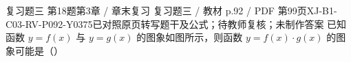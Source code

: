 \par\noindent\begin{minipage}{\linewidth}
\begin{bankitem}{复习题三 第18题}{第3章 / 章末复习 复习题三 / 教材 p.92 / PDF 第99页}{XJ-B1-C03-RV-P092-Y0375}{已对照原页转写题干及公式；待教师复核；未制作答案}
已知函数 $y=f(x)$ 与 $y=g(x)$ 的图象如图所示，则函数 $y=f(x)\cdot g(x)$ 的图象可能是（\quad）
\end{bankitem}
\end{minipage}\par\medskip
